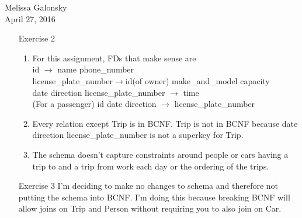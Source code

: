 \documentclass{article}
\begin{document}
\begin{flushleft}
Melissa Galonsky\\
April 27, 2016\\
\end{flushleft}
\begin{enumerate}
\item[Exercise 2]
\begin{enumerate}[1.]
\item For this assignment, FDs that make sense are\\ id $\rightarrow$ name phone\_number\\license\_plate\_number$\rightarrow$id(of owner) make\_and\_model capacity\\
date direction license\_plate\_number $\rightarrow$ time\\
(For a passenger) id date direction $\rightarrow$ license\_plate\_number
\item
Every relation except Trip is in BCNF.  Trip is not in BCNF because date direction license\_plate\_number is not a superkey for Trip. 
\item
The schema doesn't capture constraints around people or cars having a trip to and a trip from work each day or the ordering of the trips.
\end{enumerate}
\item[Exercise 3]
I'm deciding to make no changes to schema and therefore not putting the schema into BCNF.  I'm doing this because breaking BCNF will allow joins on Trip and Person without requiring you to also join on Car.
\end{enumerate}
\end{document}
